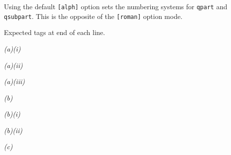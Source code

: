 \documentclass[a4paper,12pt]{article}
\begin{document}
	Using the default \verb|[alph]| option sets the numbering systems for \verb|qpart| and \verb|qsubpart|. This is the opposite of the \verb|[roman]| option mode.
	
	Expected tags at end of each line.
	
	\begin{question}
	\qpart\qsubpart
	\lipsum[1][1-4] \emph{(a)(i)}
	
	\qsubpart
	\lipsum[1][5-6] \emph{(a)(ii)}
	
	\qsubpart
	\lipsum[1][7] \emph{(a)(iii)}
	
	\qpart
	\lipsum[2][1-3] \emph{(b)}
	
	\qsubpart
	\lipsum[2][4-5] \emph{(b)(i)}
	
	\qsubpart
	\lipsum[2][6-8] \emph{(b)(ii)}
	
	\qpart
	\lipsum[3][1] \emph{(c)}
\end{question}
\end{document}
